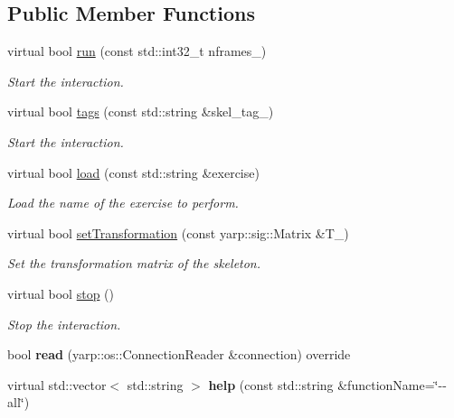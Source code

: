 \subsection*{Public Member Functions}
\begin{DoxyCompactItemize}
\item 
virtual bool \hyperlink{classactionRecognizer__IDL_a6e56afcbbc3a7c79deb5a7253b1d0b81}{run} (const std\+::int32\+\_\+t nframes\+\_\+)
\begin{DoxyCompactList}\small\item\em Start the interaction. \end{DoxyCompactList}\item 
virtual bool \hyperlink{classactionRecognizer__IDL_ad36ae79c77c3f38322202013ea418d84}{tags} (const std\+::string \&skel\+\_\+tag\+\_\+)
\begin{DoxyCompactList}\small\item\em Start the interaction. \end{DoxyCompactList}\item 
virtual bool \hyperlink{classactionRecognizer__IDL_a59683b66e727607a3e12c0ab22d2d069}{load} (const std\+::string \&exercise)
\begin{DoxyCompactList}\small\item\em Load the name of the exercise to perform. \end{DoxyCompactList}\item 
virtual bool \hyperlink{classactionRecognizer__IDL_a6fab377e711dc0334dec6442dfdfec5d}{set\+Transformation} (const yarp\+::sig\+::\+Matrix \&T\+\_\+)
\begin{DoxyCompactList}\small\item\em Set the transformation matrix of the skeleton. \end{DoxyCompactList}\item 
virtual bool \hyperlink{classactionRecognizer__IDL_ad1f380a935e15eece41825108b7c1e0e}{stop} ()
\begin{DoxyCompactList}\small\item\em Stop the interaction. \end{DoxyCompactList}\item 
\mbox{\label{classactionRecognizer__IDL_a2463d7355fa63dcd24c38f094da78f55}} 
bool {\bfseries read} (yarp\+::os\+::\+Connection\+Reader \&connection) override
\item 
\mbox{\label{classactionRecognizer__IDL_a7c4f8453a315988f5b8fa862dc768100}} 
virtual std\+::vector$<$ std\+::string $>$ {\bfseries help} (const std\+::string \&function\+Name=\char`\"{}-\/-\/all\char`\"{})
\end{DoxyCompactItemize}



